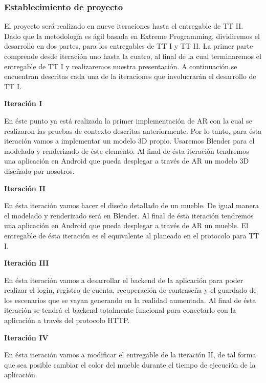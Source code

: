\subsubsection{Establecimiento de proyecto}
El proyecto será realizado en nueve iteraciones hasta el entregable de TT II. Dado que la metodología es ágil basada en Extreme Programming, dividiremos el desarrollo en dos partes, para los entregables de TT I y TT II. La primer parte comprende desde iteración uno hasta la cuatro, al final de la cual terminaremos el entregable de TT I y realizaremos nuestra presentación. A continuación se encuentran descritas cada una de la iteraciones que involucrarán el desarrollo de TT I.\par

\textbf{Iteración I} \par
En éste punto ya está realizada la primer implementación de AR con la cual se realizaron las pruebas de contexto descritas anteriormente. Por lo tanto, para ésta iteración vamos a implementar un modelo 3D propio. Usaremos Blender para el modelado y renderizado de éste elemento. Al final de ésta iteración tendremos una aplicación en Android que pueda desplegar a través de AR un modelo 3D diseñado por nosotros.

\textbf{Iteración II} \par
En ésta iteración vamos hacer el diseño detallado de un mueble. De igual manera el modelado y renderizado será en Blender. Al final de ésta iteración tendremos una aplicación en Android que pueda desplegar a través de AR un mueble. El entregable de ésta iteración es el equivalente al planeado en el protocolo para TT I.

\textbf{Iteración III} \par
En ésta iteración vamos a desarrollar el backend de la aplicación para poder realizar el login, registro de cuenta, recuperación de contraseña y el guardado de los escenarios que se vayan generando en la realidad aumentada. Al final de ésta iteración se tendrá el backend totalmente funcional para conectarlo con la aplicación a través del protocolo HTTP.

\textbf{Iteración IV} \par
En ésta iteración vamos a modificar el entregable de la iteración II, de tal forma que sea posible cambiar el color del mueble durante el tiempo de ejecución de la aplicación.




